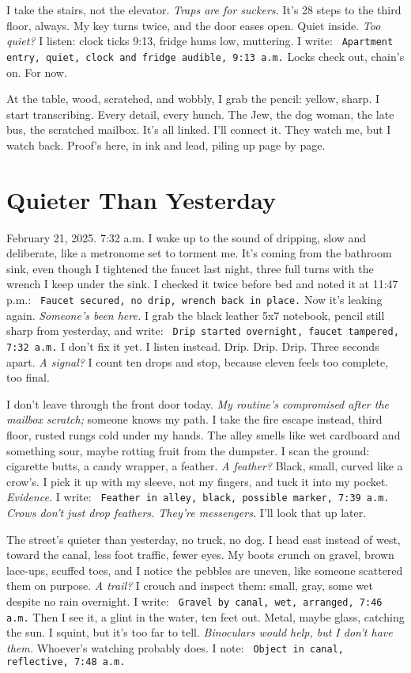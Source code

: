 \documentclass[12pt]{article} %
\newcommand{\note}[1]{\texttt{\small \color{DarkGray} #1}}
\begin{document}
I take the stairs, not the elevator. \textit{Traps are for suckers.} It’s 28 steps to the third floor, always. My key turns twice, and the door eases open. Quiet inside. \textit{Too quiet?} I listen: clock ticks 9:13, fridge hums low, muttering. I write: \note{Apartment entry, quiet, clock and fridge audible, 9:13 a.m.} Locks check out, chain’s on. For now.

At the table, wood, scratched, and wobbly, I grab the pencil: yellow, sharp. I start transcribing. Every detail, every hunch. The Jew, the dog woman, the late bus, the scratched mailbox. It’s all linked. I’ll connect it. They watch me, but I watch back. Proof’s here, in ink and lead, piling up page by page.

\section{Quieter Than Yesterday}

February 21, 2025. 7:32 a.m. I wake up to the sound of dripping, slow and deliberate, like a metronome set to torment me. It’s coming from the bathroom sink, even though I tightened the faucet last night, three full turns with the wrench I keep under the sink. I checked it twice before bed and noted it at 11:47 p.m.: \note{Faucet secured, no drip, wrench back in place.} Now it’s leaking again. \textit{Someone’s been here.} I grab the black leather 5x7 notebook, pencil still sharp from yesterday, and write: \note{Drip started overnight, faucet tampered, 7:32 a.m.} I don’t fix it yet. I listen instead. Drip. Drip. Drip. Three seconds apart. \textit{A signal?} I count ten drops and stop, because eleven feels too complete, too final.

I don’t leave through the front door today. \textit{My routine’s compromised after the mailbox scratch;} someone knows my path. I take the fire escape instead, third floor, rusted rungs cold under my hands. The alley smells like wet cardboard and something sour, maybe rotting fruit from the dumpster. I scan the ground: cigarette butts, a candy wrapper, a feather. \textit{A feather?} Black, small, curved like a crow’s. I pick it up with my sleeve, not my fingers, and tuck it into my pocket. \textit{Evidence.} I write: \note{Feather in alley, black, possible marker, 7:39 a.m.} \textit{Crows don’t just drop feathers. They’re messengers.} I’ll look that up later.

The street’s quieter than yesterday, no truck, no dog. I head east instead of west, toward the canal, less foot traffic, fewer eyes. My boots crunch on gravel, brown lace-ups, scuffed toes, and I notice the pebbles are uneven, like someone scattered them on purpose. \textit{A trail?} I crouch and inspect them: small, gray, some wet despite no rain overnight. I write: \note{Gravel by canal, wet, arranged, 7:46 a.m.} Then I see it, a glint in the water, ten feet out. Metal, maybe glass, catching the sun. I squint, but it’s too far to tell. \textit{Binoculars would help, but I don’t have them.} Whoever’s watching probably does. I note: \note{Object in canal, reflective, 7:48 a.m.}
\end{document}
